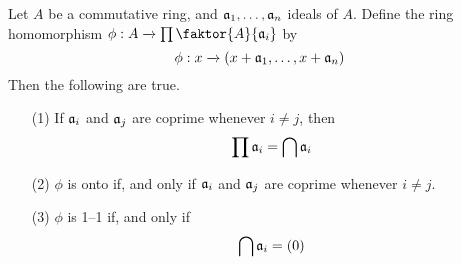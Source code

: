 \begin{lemma}\label{1.6.6}
    Let $A$ be a commutative ring, and $\mathfrak{a}_1, \dots, \mathfrak{a}_n$ ideals of $A$.
    Define the ring homomorphism  $\phi:A \xrightarrow{}
    \prod{\faktor{A}{\af_i}}$ by
    \begin{equation*}
        \phi:x \xrightarrow{} (x+\mathfrak{a}_1, \dots, x+\mathfrak{a}_n)
    \end{equation*}
    Then the following are true.
    \begin{enumerate}
        \item[(1)] If $\mathfrak{a}_i$ and  $\mathfrak{a}_j$ are coprime whenever  $i \neq j$,
            then
            \begin{equation*}
                \prod{\mathfrak{a}_i}=\bigcap{\mathfrak{a}_i}
            \end{equation*}

        \item[(2)] $\phi$ is onto if, and only if  $\mathfrak{a}_i$ and  $\mathfrak{a}_j$ are
            coprime whenever $i \neq j$.

        \item[(3)] $\phi$ is 1--1 if, and only if
            \begin{equation*}
                \bigcap{\mathfrak{a}_i}=(0)
            \end{equation*}
    \end{enumerate}
\end{lemma}

